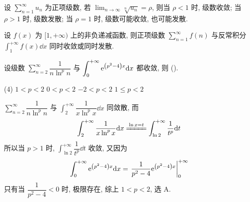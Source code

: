\begin{theorem}[根值审敛法]
    设 $\displaystyle \sum_{n=1}^{\infty} u_{n} $ 为正项级数, 若 $\displaystyle \lim _{n \to \infty} \sqrt[n]{u_{n}}=\rho $, 则当 $ \rho<1 $ 时, 级数收敛;
    当 $ \rho>1 $ 时, 级数发散; 当 $ \rho=1 $ 时, 级数可能收敛, 也可能发散.
\end{theorem}

\begin{theorem}[积分判别法]
    设 $ f(x) $ 为 $ [1,+\infty) $ 上的非负递减函数, 则正项级数 $\displaystyle  \sum_{n=1}^{\infty} f(n) $ 与反常积分 $\displaystyle \int_{1}^{+\infty} f(x) \dd x $ 同时收敛或同时发散.
\end{theorem}

\begin{example}
    设级数 $ \displaystyle \sum_{n=2}^{\infty} \dfrac{1}{n\ln ^{p}n} $ 与 $ \displaystyle \int_{0}^{+\infty} \mathrm{e} ^{\qty(p^2-4)x} \dd x $ 都收敛, 则 (\quad).
    \begin{tasks}(4)
        \task $1<p<2$
        \task $0<p<2$
        \task $-2<p<2$
        \task $1\leqslant p<2$
    \end{tasks}
\end{example}
\begin{solution}
    $ \displaystyle \sum_{n=2}^{\infty} \dfrac{1}{n\ln ^{p}n} $ 与 $\displaystyle \int_{2}^{+\infty} \dfrac{1}{x\ln ^{p}x} \dd x$ 同敛散, 而 $$
        \int_{2}^{+\infty} \dfrac{1}{x\ln ^{p}x} \dd x\xlongequal{\ln x=t}\int_{\ln 2}^{+\infty} \dfrac{1}{t^p} \dd t
    $$
    所以当 $p>1$ 时, $ \displaystyle \int_{\ln 2}^{+\infty} \dfrac{1}{t^p} \dd t $ 收敛, 又因为
    $$
        \int_{0}^{+\infty} \e ^{\qty(p^2-4)x} \dd x=\eval{\dfrac{1}{p^2-4}\e ^{\qty(p^2-4)x}}_{0}^{+\infty}
    $$
    只有当 $\dfrac{1}{p^2-4}<0$ 时, 极限存在, 综上 $1<p<2$, 选 A.
\end{solution}

